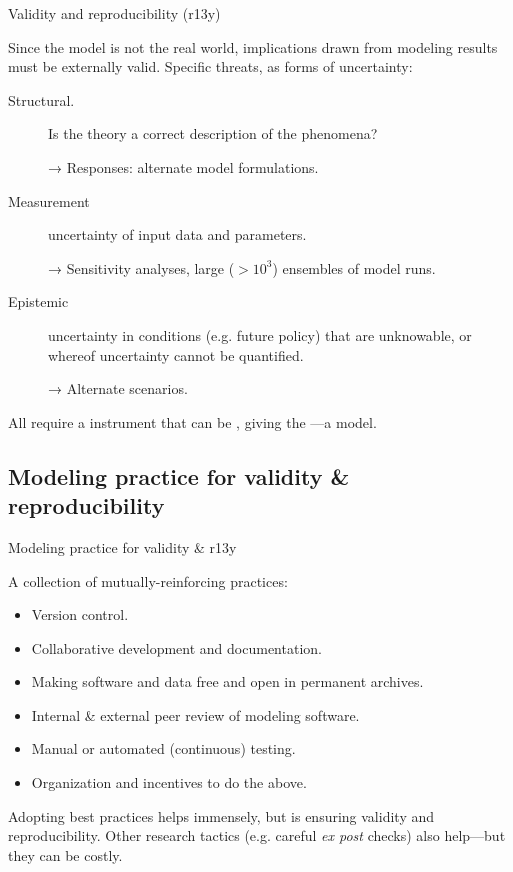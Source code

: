 \documentclass[12pt,aspectratio=169]{beamer}
\begin{document}
\begin{frame}{Validity and reproducibility (r13y)}

Since the model is not the real world, implications drawn from modeling results must be externally valid.
Specific threats, as forms of uncertainty:

\begin{description}
  \item [Structural.] Is the theory a correct description of the phenomena?

    → Responses: alternate model formulations.

  \item [Measurement] uncertainty of input data and parameters.

    → Sensitivity analyses, large ($>10^3$) ensembles of model runs.

  \item [Epistemic] uncertainty in conditions (e.g. future policy) that are unknowable, or whereof uncertainty cannot be quantified.

    → Alternate scenarios.
\end{description}

All require a  instrument that can be , giving the —a  model.
\end{frame}

\subsection{Modeling practice for validity \& reproducibility}
\begin{frame}{Modeling practice for validity \& r13y}

A collection of mutually-reinforcing practices:
\begin{itemize} \small
  \item Version control.
  \item Collaborative development and documentation.
  \item Making software and data free and open in permanent archives.
  \item Internal \& external peer review of modeling software.
  \item Manual or automated (continuous) testing.
  \item Organization and incentives to do the above.
\end{itemize}

\bigskip
Adopting best practices helps immensely, but is  ensuring validity and reproducibility.
Other research tactics (e.g. careful \emph{ex post} checks) also help—but they can be costly.

\end{frame}
\end{document}
